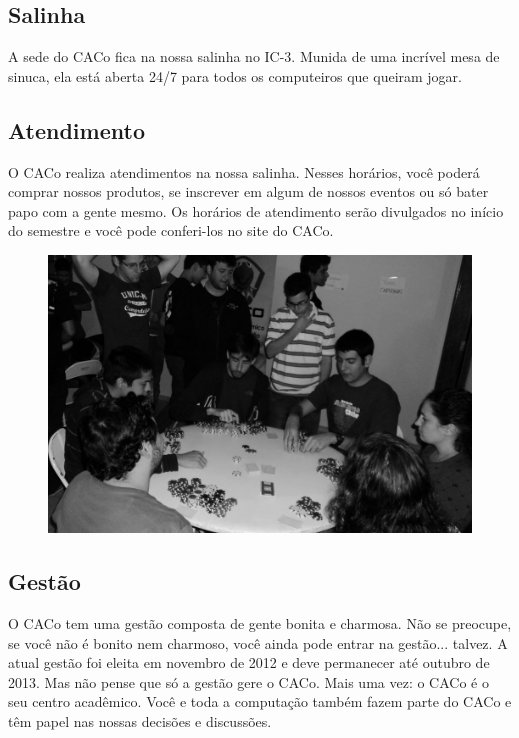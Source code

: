 \subsection{Salinha}

A sede do CACo fica na nossa salinha no IC-3. Munida de uma incrível mesa de
sinuca, ela está aberta 24/7 para todos os computeiros que queiram jogar.

\subsection{Atendimento}

O CACo realiza atendimentos na nossa salinha. Nesses horários, você poderá
comprar nossos produtos, se inscrever em algum de nossos eventos ou só bater papo
com a gente mesmo. Os horários de atendimento serão divulgados no início do
semestre e você pode conferi-los no site do CACo.

\begin{figure}[H]
    \centering
    \includegraphics[scale=0.21]{img/caco/poker.jpg}
\end{figure}

\subsection{Gestão}

O CACo tem uma gestão composta de gente bonita e charmosa. Não se preocupe, se
você não é bonito nem charmoso, você ainda pode entrar na gestão... talvez. A
atual gestão foi eleita em novembro de 2012 e deve permanecer até outubro de
2013. Mas não pense que só a gestão gere o CACo. Mais uma vez: o CACo é o seu
centro acadêmico. Você e toda a computação também fazem parte do CACo e têm papel
nas nossas decisões e discussões.

